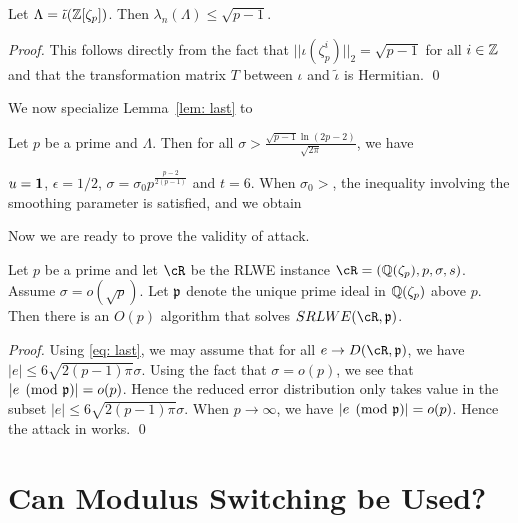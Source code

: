 \documentclass[envcountsect]{llncs}
\begin{document}
\begin{lemma}
Let $\Lambda = \tilde{\iota}(\mathbb{Z}[\zeta_p])$. Then $\lambda_n(\Lambda) \leq \sqrt{p-1}$.
\end{lemma}

\begin{proof}
This follows directly from the fact that $||\iota(\zeta_p^i)||_2 = \sqrt{p-1}$ for all $i \in \mathbb{Z}$ and that the transformation matrix $T$ between $\iota$ and $\tilde{\iota}$ is Hermitian.
\qed \end{proof}


We now specialize Lemma~\ref{lem: last} to

\begin{proposition}
Let $p$ be a prime and $\Lambda$. Then for all $\sigma > \frac{\sqrt{p-1} \ln(2p-2)}{\sqrt{2 \pi}}$, we have
\end{proposition}
$u = {\bf 1}$, $\epsilon = 1/2$, $\sigma = \sigma_0 p^{\frac{p-2}{2(p-1)}}$ and $t = 6$. When $\sigma_0 > $, the inequality involving the smoothing parameter is satisfied, and we obtain

Now we are ready to prove the validity of attack.
\begin{theorem}
Let $p$ be a prime and let $\cR$ be the RLWE instance $\cR = (\bQ(\zeta_p), p, \sigma,s)$.
Assume $\sigma = o(\sqrt{p})$. Let $\mathfrak{p}$ denote the unique prime ideal in $\mathbb{Q}(\zeta_p)$ above $p$. Then there is an $O(p)$ algorithm that solves $SRLWE(\cR,\fp)$.
\end{theorem}

\begin{proof}
Using \ref{eq: last}, we may assume that for all $e \to D(\cR,\fp)$, we have $|e|\leq 6\sqrt{2(p-1)\pi} \sigma$. Using the fact that $\sigma = o(p)$, we see that $|e \pmod{\mathfrak{p}}| = o(p)$. Hence the reduced error distribution only takes value in the subset
$|e|\leq 6\sqrt{2(p-1)\pi} \sigma$. When $p \to \infty$, we have $|e \pmod {\mathfrak{p}}| = o(p)$.  Hence the attack in \cite{elos2015weak} works.
\qed \end{proof}
\fi

\section{Can Modulus Switching be Used?}
\end{document}
